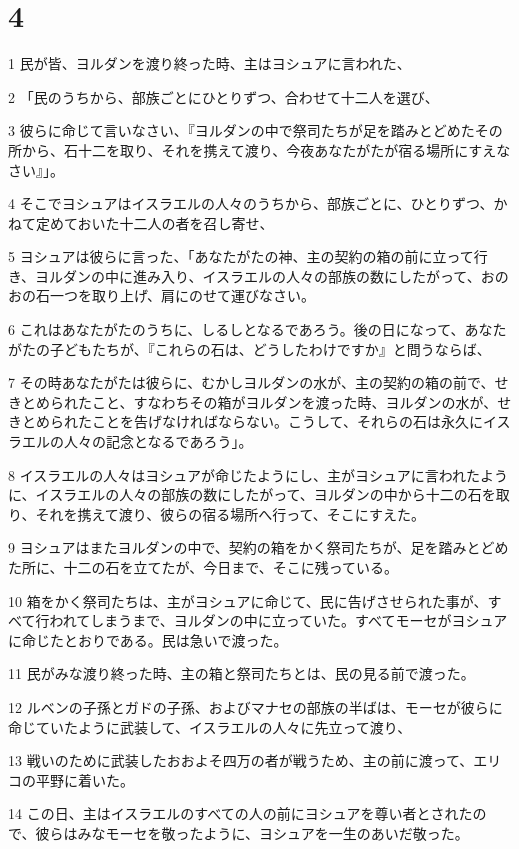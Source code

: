 \chapter{4}

\par 1 民が皆、ヨルダンを渡り終った時、主はヨシュアに言われた、
\par 2 「民のうちから、部族ごとにひとりずつ、合わせて十二人を選び、
\par 3 彼らに命じて言いなさい、『ヨルダンの中で祭司たちが足を踏みとどめたその所から、石十二を取り、それを携えて渡り、今夜あなたがたが宿る場所にすえなさい』」。
\par 4 そこでヨシュアはイスラエルの人々のうちから、部族ごとに、ひとりずつ、かねて定めておいた十二人の者を召し寄せ、
\par 5 ヨシュアは彼らに言った、「あなたがたの神、主の契約の箱の前に立って行き、ヨルダンの中に進み入り、イスラエルの人々の部族の数にしたがって、おのおの石一つを取り上げ、肩にのせて運びなさい。
\par 6 これはあなたがたのうちに、しるしとなるであろう。後の日になって、あなたがたの子どもたちが、『これらの石は、どうしたわけですか』と問うならば、
\par 7 その時あなたがたは彼らに、むかしヨルダンの水が、主の契約の箱の前で、せきとめられたこと、すなわちその箱がヨルダンを渡った時、ヨルダンの水が、せきとめられたことを告げなければならない。こうして、それらの石は永久にイスラエルの人々の記念となるであろう」。
\par 8 イスラエルの人々はヨシュアが命じたようにし、主がヨシュアに言われたように、イスラエルの人々の部族の数にしたがって、ヨルダンの中から十二の石を取り、それを携えて渡り、彼らの宿る場所へ行って、そこにすえた。
\par 9 ヨシュアはまたヨルダンの中で、契約の箱をかく祭司たちが、足を踏みとどめた所に、十二の石を立てたが、今日まで、そこに残っている。
\par 10 箱をかく祭司たちは、主がヨシュアに命じて、民に告げさせられた事が、すべて行われてしまうまで、ヨルダンの中に立っていた。すべてモーセがヨシュアに命じたとおりである。民は急いで渡った。
\par 11 民がみな渡り終った時、主の箱と祭司たちとは、民の見る前で渡った。
\par 12 ルベンの子孫とガドの子孫、およびマナセの部族の半ばは、モーセが彼らに命じていたように武装して、イスラエルの人々に先立って渡り、
\par 13 戦いのために武装したおおよそ四万の者が戦うため、主の前に渡って、エリコの平野に着いた。
\par 14 この日、主はイスラエルのすべての人の前にヨシュアを尊い者とされたので、彼らはみなモーセを敬ったように、ヨシュアを一生のあいだ敬った。
